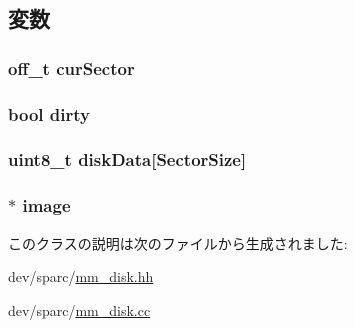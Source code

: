\subsection{変数}
\hypertarget{classMmDisk_ac818f733a8c55e0be72dbdadc453c769}{
\subsubsection[{curSector}]{\setlength{\rightskip}{0pt plus 5cm}off\_\-t {\bf curSector}}}
\label{classMmDisk_ac818f733a8c55e0be72dbdadc453c769}
\hypertarget{classMmDisk_ad25edacba00e4d0666a9959053b7cc10}{
\subsubsection[{dirty}]{\setlength{\rightskip}{0pt plus 5cm}bool {\bf dirty}}}
\label{classMmDisk_ad25edacba00e4d0666a9959053b7cc10}
\hypertarget{classMmDisk_a981f17e4c4f4909188222a7be11afaf8}{
\subsubsection[{diskData}]{\setlength{\rightskip}{0pt plus 5cm}uint8\_\-t {\bf diskData}\mbox{[}SectorSize\mbox{]}}}
\label{classMmDisk_a981f17e4c4f4909188222a7be11afaf8}
\hypertarget{classMmDisk_a86d47120637a95e3a6876c774d768030}{
\subsubsection[{image}]{$\ast$ {\bf image}}}
\label{classMmDisk_a86d47120637a95e3a6876c774d768030}


このクラスの説明は次のファイルから生成されました:\begin{DoxyCompactItemize}
\item 
dev/sparc/\hyperlink{mm__disk_8hh}{mm\_\-disk.hh}\item 
dev/sparc/\hyperlink{mm__disk_8cc}{mm\_\-disk.cc}\end{DoxyCompactItemize}
